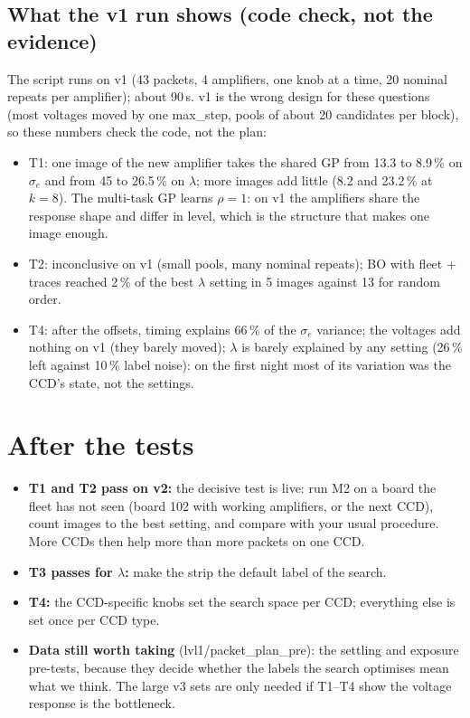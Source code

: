 \documentclass[11pt]{article}
\newcommand{\se}{\sigma_e}
\begin{document}
\subsection*{What the v1 run shows (code check, not the evidence)}
The script runs on v1 (43 packets, 4 amplifiers, one knob at a time, 20 nominal repeats per amplifier); about 90\,s. v1 is
the wrong design for these questions (most voltages moved by one max\_step, pools of about 20 candidates per block), so
these numbers check the code, not the plan:
\begin{itemize}
\item T1: one image of the new amplifier takes the shared GP from 13.3 to 8.9\,\% on $\se$ and from 45 to 26.5\,\% on
  $\lambda$; more images add little (8.2 and 23.2\,\% at $k = 8$). The multi-task GP learns $\rho = 1$: on v1 the
  amplifiers share the response shape and differ in level, which is the structure that makes one image enough.
\item T2: inconclusive on v1 (small pools, many nominal repeats); BO with fleet + traces reached 2\,\% of the best
  $\lambda$ setting in 5 images against 13 for random order.
\item T4: after the offsets, timing explains 66\,\% of the $\se$ variance; the voltages add nothing on v1 (they barely
  moved); $\lambda$ is barely explained by any setting (26\,\% left against 10\,\% label noise): on the first night most
  of its variation was the CCD's state, not the settings.
\end{itemize}

\section{After the tests}
\begin{itemize}
\item \textbf{T1 and T2 pass on v2:} the decisive test is live: run M2 on a board the fleet has not seen (board 102 with
  working amplifiers, or the next CCD), count images to the best setting, and compare with your usual procedure. More
  CCDs then help more than more packets on one CCD.
\item \textbf{T3 passes for $\lambda$:} make the strip the default label of the search.
\item \textbf{T4:} the CCD-specific knobs set the search space per CCD; everything else is set once per CCD type.
\item \textbf{Data still worth taking} (lvl1/packet\_plan\_pre): the settling and exposure pre-tests, because they decide
  whether the labels the search optimises mean what we think. The large v3 sets are only needed if T1--T4 show the
  voltage response is the bottleneck.
\end{itemize}
\end{document}
